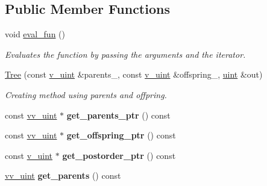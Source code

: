 \subsection*{Public Member Functions}
\begin{DoxyCompactItemize}
\item 
\mbox{\label{classpruner_1_1Tree_abaa9ef6d7eacf37302d29c12c2180c3a}} 
void \hyperlink{classpruner_1_1Tree_abaa9ef6d7eacf37302d29c12c2180c3a}{eval\+\_\+fun} ()
\begin{DoxyCompactList}\small\item\em Evaluates the function by passing the arguments and the iterator. \end{DoxyCompactList}\item 
\hyperlink{classpruner_1_1Tree_a0f964d9ba9834822d3e18946a5361839}{Tree} (const \hyperlink{namespacepruner_af0145646bd7ede012cd336b416bc5579}{v\+\_\+uint} \&parents\+\_\+, const \hyperlink{namespacepruner_af0145646bd7ede012cd336b416bc5579}{v\+\_\+uint} \&offspring\+\_\+, \hyperlink{namespacepruner_a659e6e64a9e2b8e981c3d34262a2f67e}{uint} \&out)
\begin{DoxyCompactList}\small\item\em Creating method using parents and offpring. \end{DoxyCompactList}\item 
\mbox{\label{classpruner_1_1Tree_a139a3b8967c105550f70398b204c512b}} 
const \hyperlink{namespacepruner_acc0badaa0c5a170f5f93cfc20ec428a2}{vv\+\_\+uint} $\ast$ {\bfseries get\+\_\+parents\+\_\+ptr} () const
\item 
\mbox{\label{classpruner_1_1Tree_a4bd69dff4d8c917351befa76ded25b1f}} 
const \hyperlink{namespacepruner_acc0badaa0c5a170f5f93cfc20ec428a2}{vv\+\_\+uint} $\ast$ {\bfseries get\+\_\+offspring\+\_\+ptr} () const
\item 
\mbox{\label{classpruner_1_1Tree_a06ddf2fa7c82f5b17baddd0be86c6807}} 
const \hyperlink{namespacepruner_af0145646bd7ede012cd336b416bc5579}{v\+\_\+uint} $\ast$ {\bfseries get\+\_\+postorder\+\_\+ptr} () const
\item 
\mbox{\label{classpruner_1_1Tree_abbbc31aceeed469c117a47dbb0585ba3}} 
\hyperlink{namespacepruner_acc0badaa0c5a170f5f93cfc20ec428a2}{vv\+\_\+uint} {\bfseries get\+\_\+parents} () const

\end{DoxyCompactItemize}
